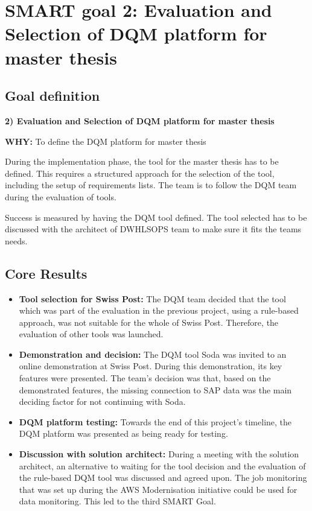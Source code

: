 \section{SMART goal 2: Evaluation and Selection of DQM platform for master thesis}
\subsection*{Goal definition}
\textbf{2) Evaluation and Selection of DQM platform for master thesis}
    
\textbf{WHY:} To define the DQM platform for master thesis

During the implementation phase, the tool for the master thesis has to be defined. This requires a structured approach for the selection of the tool, including the setup of requirements lists. The team is to follow the DQM team during the evaluation of tools.

Success is measured by having the DQM tool defined. The tool selected has to be discussed with the architect of \gls{DWHLSOPS} team to make sure it fits the teams needs.




\subsection*{Core Results}

\begin{itemize}
    
\item \textbf{Tool selection for Swiss Post:} The DQM team decided that the tool which was part of the evaluation in the previous project, using a rule-based approach, was not suitable for the whole of Swiss Post. Therefore, the evaluation of other tools was launched.

\item \textbf{Demonstration and decision:} The DQM tool Soda was invited to an online demonstration at Swiss Post. During this demonstration, its key features were presented. The team's decision was that, based on the demonstrated features, the missing connection to SAP data was the main deciding factor for not continuing with Soda.

\item \textbf{DQM platform testing:} Towards the end of this project's timeline, the DQM platform was presented as being ready for testing.

\item \textbf{Discussion with solution architect:} During a meeting with the solution architect, an alternative to waiting for the tool decision and the evaluation of the rule-based DQM tool was discussed and agreed upon. The job monitoring that was set up during the AWS Modernisation initiative could be used for data monitoring. This led to the third SMART Goal.
\end{itemize}



